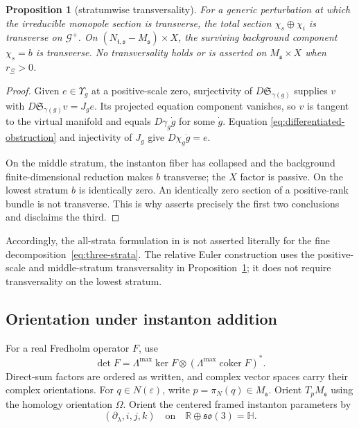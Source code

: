 \documentclass[11pt]{amsart}
\newtheorem{proposition}[theorem]{Proposition}
\theoremstyle{definition}
\theoremstyle{remark}
\theoremstyle{plain}
\newcommand{\RR}{\mathbb{R}}
\newcommand{\cG}{\mathcal{G}}
\newcommand{\coker}{\operatorname{coker}}
\begin{document}
\begin{proposition}[stratumwise transversality]\label{prop:transversality}
For a generic perturbation at which the irreducible monopole section is
transverse, the total section $\chi_s\oplus\chi_i$ is transverse on
$\cG^+$.  On
$(N_{\mathfrak t,\mathfrak s}-M_{\mathfrak s})\times X$, the surviving
background component $\chi_s=b$ is transverse.  No transversality holds or
is asserted on $M_{\mathfrak s}\times X$ when $r_\Xi>0$.
\end{proposition}

\begin{proof}
Given $e\in\Upsilon_g$ at a positive-scale zero, surjectivity of
$D\mathfrak S_{\gamma(g)}$ supplies $v$ with
$D\mathfrak S_{\gamma(g)}v=J_ge$.  Its projected equation component
vanishes, so $v$ is tangent to the virtual manifold and equals
$D\gamma_g\dot g$ for some $\dot g$.  Equation
\eqref{eq:differentiated-obstruction} and injectivity of $J_g$ give
$D\chi_g\dot g=e$.

On the middle stratum, the instanton fiber has collapsed and the background
finite-dimensional reduction makes $b$ transverse; the $X$ factor is
passive.  On the lowest stratum $b$ is identically zero.  An identically zero
section of a positive-rank bundle is not transverse.  This is why
\cite[Theorem~3.8 and Section~5.1]{FeehanLenessLevelOne} asserts precisely
the first two conclusions and disclaims the third.
\end{proof}

Accordingly, the all-strata formulation in
\cite[Hypothesis~7.8.1(2)]{FeehanLenessCobordism} is not asserted literally
for the fine decomposition~\eqref{eq:three-strata}.  The relative Euler
construction uses the positive-scale and middle-stratum transversality
in Proposition~\ref{prop:transversality}; it does not require transversality
on the lowest stratum.

\subsection{Orientation under instanton addition}
For a real Fredholm operator $F$, use
\[
 \det F=\Lambda^{\max}\ker F\otimes
 (\Lambda^{\max}\coker F)^*.
\]
Direct-sum factors are ordered as written, and complex vector spaces carry
their complex orientations.  For $q\in N(\varepsilon)$, write
$p=\pi_N(q)\in M_{\mathfrak s}$.  Orient $T_pM_{\mathfrak s}$ using the homology
orientation $\Omega$.  Orient the centered framed instanton parameters
by
\begin{equation}\label{eq:quaternionic-orientation}
 (\partial_\lambda,i,j,k)
 \quad\text{on}\quad \RR\oplus\mathfrak{so}(3)=\mathbb H.
\end{equation}
\end{document}
